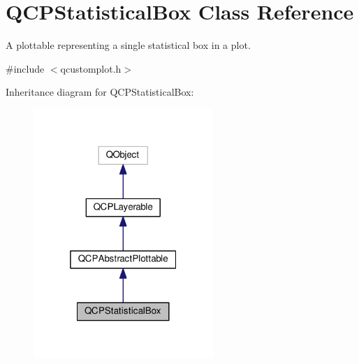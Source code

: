 \hypertarget{classQCPStatisticalBox}{}\section{Q\+C\+P\+Statistical\+Box Class Reference}
\label{classQCPStatisticalBox}


A plottable representing a single statistical box in a plot.  




{\ttfamily \#include $<$qcustomplot.\+h$>$}



Inheritance diagram for Q\+C\+P\+Statistical\+Box\+:
\nopagebreak
\begin{figure}[H]
\begin{center}
\leavevmode
\includegraphics[width=193pt]{classQCPStatisticalBox__inherit__graph}
\end{center}
\end{figure}


